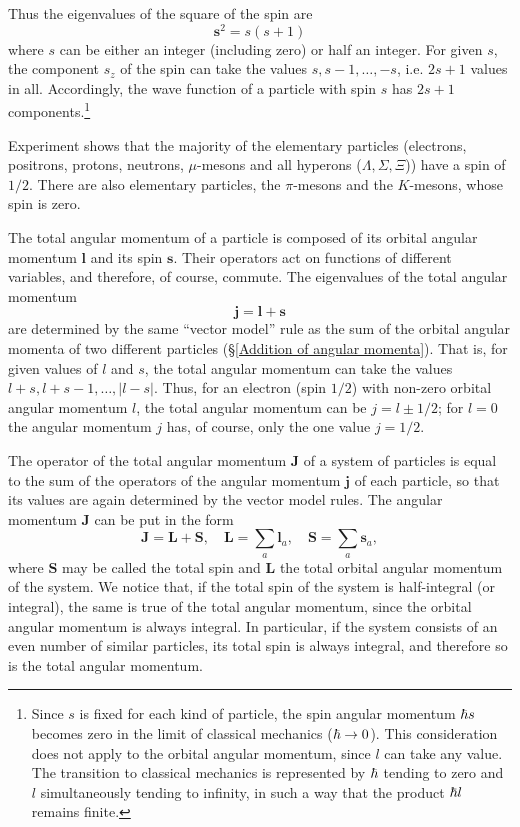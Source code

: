 Thus the eigenvalues of the square of the spin are
\begin{equation}\label{54.2}
\bm{s}^2=s(s+1)
\end{equation}
where $ s $ can be either an integer (including zero) or half an integer. For given $ s $, the component $ s_z $ of the spin can take the values $ s, s - 1, \dots, -s $, i.e. $ 2s+1 $ values in all. Accordingly, the wave function of a particle with spin $ s $ has $ 2s + 1 $ components.\footnote{Since $ s $ is fixed for each kind of particle, the spin angular momentum $ \hbar s $ becomes zero in the limit of classical mechanics ($ \hbar\to0 $). This consideration does not apply to the orbital angular momentum, since $ l $ can take any value. The transition to classical mechanics is represented by $ \hbar $ tending to zero and $ l $ simultaneously tending to infinity, in such a way that the product $ \hbar l $ remains finite.}

Experiment shows that the majority of the elementary particles (electrons, positrons, protons, neutrons, $ \mu $-mesons and all hyperons ($ \Lambda,\Sigma,\Xi $)) have a spin of $ 1/2 $. There are also elementary particles, the $\pi$-mesons and the $ K $-mesons, whose spin is zero.

The total angular momentum of a particle is composed of its orbital angular momentum $ \bm{l} $ and its spin $ \bm{s} $. Their operators act on functions of different variables, and therefore, of course, commute. The eigenvalues of the total angular momentum
\begin{equation}\label{54.3}
\bm{j}=\bm{l}+\bm{s}
\end{equation}
are determined by the same “vector model” rule as the sum of the orbital angular momenta of two different particles (\S\ref{Addition of angular momenta}). That is, for given values of $ l $ and $ s $, the total angular momentum can take the values $ l+s, l+s- 1, \dots, |l−s| $. Thus, for an electron (spin $ 1/2 $) with non-zero orbital angular momentum $ l $, the total angular momentum can be $ j = l \pm1/2 $; for $ l = 0 $ the angular momentum $ j $ has, of course, only the one value $ j = 1/2$.

The operator of the total angular momentum $ \bm{J} $ of a system of particles is equal to the sum of the operators of the angular momentum $ \bm{j} $ of each particle, so that its values are again determined by the vector model rules. The angular momentum $ \bm{J} $ can be put in the form
\begin{equation}\label{54.4}
\bm{J}=\bm{L}+\bm{S},\quad\bm{L}=\sum_{a}\bm{l}_a,\quad\bm{S}=\sum_{a}\bm{s}_a,
\end{equation}
where $ \bm{S} $ may be called the total spin and $ \bm{L} $ the total orbital angular momentum of the system. We notice that, if the total spin of the system is half-integral (or integral), the same is true of the total angular momentum, since the orbital angular momentum is always integral. In particular, if the system consists of an even number of similar particles, its total spin is always integral, and therefore so is the total angular momentum.


